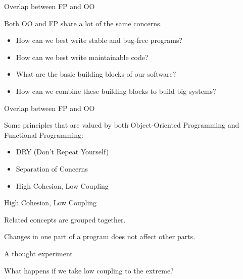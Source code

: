 \documentclass{beamer}
\begin{document}
\begin{frame}{Overlap between FP and OO}

  {\Large Both OO and FP share a lot of the same
    concerns.}

  \begin{itemize}[<+->]
  \item {\Large How can we best write stable and bug-free programs?}
  \item {\Large How can we best write maintainable code?}
  \item {\Large What are the basic building blocks of our software?}
  \item {\Large How can we combine these building blocks to build big
    systems?}
  \end{itemize}

\end{frame}


\begin{frame}{Overlap between FP and OO}

  {\Large Some principles that are valued by both Object-Oriented
    Programming and Functional Programming:}

  \begin{itemize}[<+->]
  \item DRY (Don't Repeat Yourself)
  \item Separation of Concerns
  \item High Cohesion, Low Coupling
  \end{itemize}

\end{frame}

\begin{frame}{High Cohesion, Low Coupling}

  \begin{description}[<+->]
  \item[High Cohesion] Related concepts are grouped together.
  \item[Low Coupling] Changes in one part of a program does not
    affect other parts.
  \end{description}
\end{frame}

\begin{frame}{A thought experiment}

  {\Huge What happens if we take low coupling to the extreme?}

\end{frame}
\end{document}
